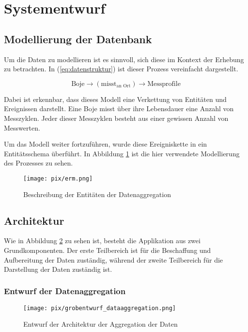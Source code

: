 \section{Systementwurf}

\subsection{Modellierung der Datenbank}

Um die Daten zu modellieren ist es sinnvoll, sich diese im Kontext der Erhebung zu betrachten. In (\ref{eq:datenstruktur}) ist dieser Prozess vereinfacht dargestellt.

\begin{equation}
    \mbox{Boje} \to (\mbox{misst}_{\mbox{an Ort}}) \to \mbox{Messprofile}\label{eq:datenstruktur}
\end{equation}

Dabei ist erkennbar, dass dieses Modell eine Verkettung von Entitäten und Ereignissen darstellt. Eine Boje misst über ihre Lebensdauer eine Anzahl von Messzyklen. Jeder dieser Messzyklen besteht aus einer gewissen Anzahl von Messwerten.

Um das Modell weiter fortzuführen, wurde diese Ereigniskette in ein Entitätsschema überführt. In Abbildung \ref{fig:ERM} ist die hier verwendete Modellierung des Prozesses zu sehen.

\begin{figure}[h!]
    \centering
    \texttt{[image: pix/erm.png]}
    \caption{Beschreibung der Entitäten der Datenaggregation}
    \label{fig:ERM}
\end{figure}


\subsection{Architektur}


Wie in Abbildung \ref{fig:grobetwurf_architektur_datenaggregation} zu sehen ist, besteht die Applikation aus zwei Grundkomponenten. Der erste Teilbereich ist für die Beschaffung und Aufbereitung der Daten zuständig, während der zweite Teilbereich für die Darstellung der Daten zuständig ist.

\subsubsection{Entwurf der Datenaggregation}\label{sec:entwurfAggregation}
\begin{figure}[h!]
\centering
\texttt{[image: pix/grobentwurf\_dataaggregation.png]}
\caption{Entwurf der Architektur der Aggregation der Daten}
\label{fig:grobetwurf_architektur_datenaggregation}
\end{figure}

